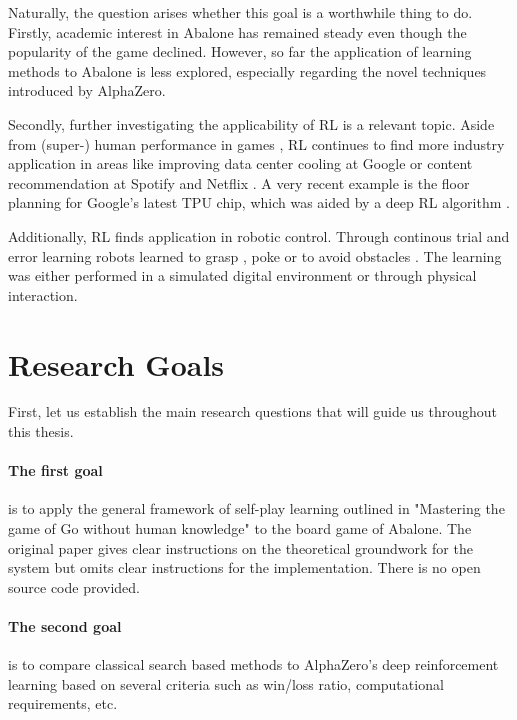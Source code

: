 Naturally, the question arises whether this goal is a worthwhile thing to do. Firstly, academic interest in Abalone has remained steady even though the popularity of the game declined. However, so far the application of learning methods to Abalone is less explored, especially regarding the novel techniques introduced by AlphaZero.

Secondly, further investigating the applicability of RL is a relevant topic. Aside from (super-) human performance in games \cite{mnih_human-level_2015, berner_dota_2019,vinyals_grandmaster_2019}, RL continues to find more industry application in areas like improving data center cooling at Google \cite{gamble_safety-first_2018} or content recommendation at Spotify \cite{jebara_for_2020} and Netflix \cite{siddiqi_ml_2019}. A very recent example is the floor planning for Google's latest TPU chip, which was aided by a deep RL algorithm \cite{mirhoseini_graph_2021}.

Additionally, RL finds application in robotic control. Through continous trial and error learning robots learned to grasp \cite{pinto_supersizing_2016,zeng_learning_2018}, poke \cite{agrawal_learning_nodate} or to avoid obstacles \cite{kahn_uncertainty-aware_2017}. The learning was either performed in a simulated digital environment or through physical interaction.

\section{Research Goals}
First, let us establish the main research questions that will guide us throughout this thesis.

\paragraph{The first goal} is to apply the general framework of self-play learning outlined in "Mastering the game of Go without human knowledge" to the board game of Abalone. \cite{silver_mastering_2017} The original paper gives clear instructions on the theoretical groundwork for the system but omits clear instructions for the implementation. There is no open source code provided.

\paragraph{The second goal} is to compare classical search based methods to AlphaZero's deep reinforcement learning based on several criteria such as win/loss ratio, computational requirements, etc.

